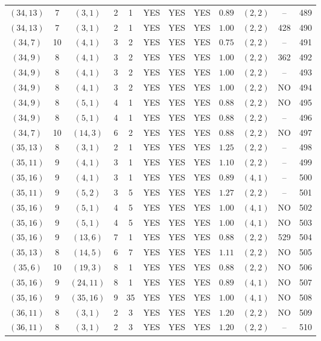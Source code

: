 \begin{longtable}{|c|c|c|c|c|c|c|c|c|c|c|c|}
$(34,13)$ & 7 & $(3,1)$ & 2 & 1 & YES & YES & YES & $0.89$ & $(2,2)$ & -- & 489\\
$(34,13)$ & 7 & $(3,1)$ & 2 & 1 & YES & YES & YES & $1.00$ & $(2,2)$ & 428 & 490\\
$(34,7)$ & 10 & $(4,1)$ & 3 & 2 & YES & YES & YES & $0.75$ & $(2,2)$ & -- & 491\\
$(34,9)$ & 8 & $(4,1)$ & 3 & 2 & YES & YES & YES & $1.00$ & $(2,2)$ & 362 & 492\\
$(34,9)$ & 8 & $(4,1)$ & 3 & 2 & YES & YES & YES & $1.00$ & $(2,2)$ & -- & 493\\
$(34,9)$ & 8 & $(4,1)$ & 3 & 2 & YES & YES & YES & $1.00$ & $(2,2)$ & NO & 494\\
$(34,9)$ & 8 & $(5,1)$ & 4 & 1 & YES & YES & YES & $0.88$ & $(2,2)$ & NO & 495\\
$(34,9)$ & 8 & $(5,1)$ & 4 & 1 & YES & YES & YES & $0.88$ & $(2,2)$ & -- & 496\\
$(34,7)$ & 10 & $(14,3)$ & 6 & 2 & YES & YES & YES & $0.88$ & $(2,2)$ & NO & 497\\
$(35,13)$ & 8 & $(3,1)$ & 2 & 1 & YES & YES & YES & $1.25$ & $(2,2)$ & -- & 498\\
$(35,11)$ & 9 & $(4,1)$ & 3 & 1 & YES & YES & YES & $1.10$ & $(2,2)$ & -- & 499\\
$(35,16)$ & 9 & $(4,1)$ & 3 & 1 & YES & YES & YES & $0.89$ & $(4,1)$ & -- & 500\\
$(35,11)$ & 9 & $(5,2)$ & 3 & 5 & YES & YES & YES & $1.27$ & $(2,2)$ & -- & 501\\
$(35,16)$ & 9 & $(5,1)$ & 4 & 5 & YES & YES & YES & $1.00$ & $(4,1)$ & NO & 502\\
$(35,16)$ & 9 & $(5,1)$ & 4 & 5 & YES & YES & YES & $1.00$ & $(4,1)$ & NO & 503\\
$(35,16)$ & 9 & $(13,6)$ & 7 & 1 & YES & YES & YES & $0.88$ & $(2,2)$ & 529 & 504\\
$(35,13)$ & 8 & $(14,5)$ & 6 & 7 & YES & YES & YES & $1.11$ & $(2,2)$ & NO & 505\\
$(35,6)$ & 10 & $(19,3)$ & 8 & 1 & YES & YES & YES & $0.88$ & $(2,2)$ & NO & 506\\
$(35,16)$ & 9 & $(24,11)$ & 8 & 1 & YES & YES & YES & $0.89$ & $(4,1)$ & NO & 507\\
$(35,16)$ & 9 & $(35,16)$ & 9 & 35 & YES & YES & YES & $1.00$ & $(4,1)$ & NO & 508\\
$(36,11)$ & 8 & $(3,1)$ & 2 & 3 & YES & YES & YES & $1.20$ & $(2,2)$ & NO & 509\\
$(36,11)$ & 8 & $(3,1)$ & 2 & 3 & YES & YES & YES & $1.20$ & $(2,2)$ & -- & 510\\

\end{longtable}
